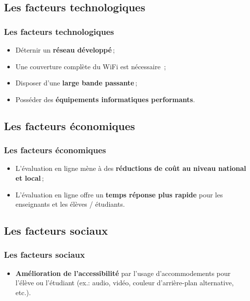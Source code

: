\documentclass{beamer}
\begin{document}
			
			
		\subsection{Les facteurs technologiques} 
			\begin{frame}
			 	\frametitle{Les facteurs technologiques \citep{NorthCarolina2013}}
				\begin {itemize}
							\item Déternir un \textbf{réseau développé}\,;
							\item Une couverture complète du WiFi est nécessaire \citep{Stansbury2013B}\,;
							\item Disposer d'une \textbf{large bande passante}\,;
							\item Posséder des \textbf{équipements informatiques performants}.						
				\end{itemize}
			\end{frame}
			
		\subsection{Les facteurs économiques} 
			\begin{frame}
			 	\frametitle{Les facteurs économiques\citep{NorthCarolina2013}}
				\begin {itemize}
					\item L'évaluation en ligne mène à des \textbf{réductions de coût au niveau national et local}\,;
					\item L'évaluation en ligne offre un \textbf{temps réponse plus rapide} pour les enseignants et les élèves / étudiants.
				\end{itemize}
			\end{frame}
			
		\subsection{Les facteurs sociaux} 
			\begin{frame}
			 	\frametitle{Les facteurs sociaux \citep{NorthCarolina2013}}
				\begin {itemize}
					\item \textbf{Amélioration de l'accessibilité} par l'usage d'accommodements pour l'élève ou l'étudiant (ex.: audio, vidéo, couleur d'arrière-plan alternative, etc.).
					
				\end{itemize}
			\end{frame}
			
\end{document}
